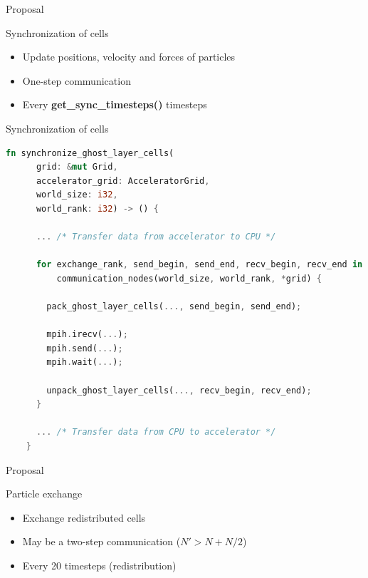 \documentclass[aspectratio=43,t]{beamer}
\begin{document}
  \begin{frame}{Proposal}
    \begin{block}{Synchronization of cells}
      \begin{itemize}
        \item Update positions, velocity and forces of particles
        \item One-step communication
        \item Every \textbf{get\_sync\_timesteps()} timesteps
      \end{itemize}
    \end{block}
  \end{frame}

  \begin{frame}[fragile]{Synchronization of cells}
    \begin{lstlisting}[basicstyle=\tiny\ttfamily,language=Rust]
    fn synchronize_ghost_layer_cells(
      grid: &mut Grid,
      accelerator_grid: AcceleratorGrid,
      world_size: i32,
      world_rank: i32) -> () {

      ... /* Transfer data from accelerator to CPU */

      for exchange_rank, send_begin, send_end, recv_begin, recv_end in
          communication_nodes(world_size, world_rank, *grid) {

        pack_ghost_layer_cells(..., send_begin, send_end);

        mpih.irecv(...);
        mpih.send(...);
        mpih.wait(...);

        unpack_ghost_layer_cells(..., recv_begin, recv_end);
      }

      ... /* Transfer data from CPU to accelerator */
    }
    \end{lstlisting}
  \end{frame}

  \begin{frame}{Proposal}
    \begin{block}{Particle exchange}
      \begin{itemize}
        \item Exchange redistributed cells
        \item May be a two-step communication ($N' > N + N/2$)
        \item Every 20 timesteps (redistribution)
      \end{itemize}
    \end{block}
  \end{frame}
\end{document}
